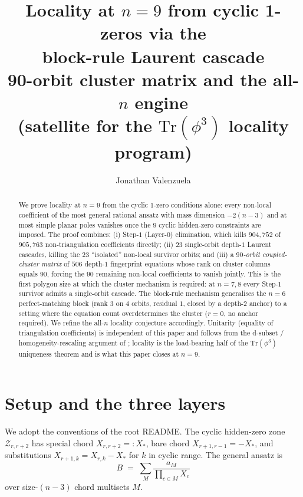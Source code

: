 \documentclass[11pt]{article}
\title{Locality at $n=9$ from cyclic 1-zeros via the\\
       block-rule Laurent cascade\\
       \large 90-orbit cluster matrix and the all-$n$ engine\\
       \small (satellite for the $\mathrm{Tr}(\phi^3)$ locality program)}
\author{Jonathan Valenzuela}
\date{}
\theoremstyle{definition}
\begin{document}
\maketitle

\begin{abstract}
We prove locality at $n=9$ from the cyclic $1$-zero conditions alone:
every non-local coefficient of the most general rational ansatz with
mass dimension $-2(n-3)$ and at most simple planar poles vanishes
once the $9$ cyclic hidden-zero constraints are imposed. The proof
combines: (i) Step-$1$ (Layer-$0$) elimination, which kills
$904{,}752$ of $905{,}763$ non-triangulation coefficients directly;
(ii) $23$ single-orbit depth-$1$ Laurent cascades, killing the
$23$ ``isolated'' non-local survivor orbits; and (iii) a
\emph{$90$-orbit coupled-cluster matrix} of $506$ depth-$1$
fingerprint equations whose rank on cluster columns equals $90$,
forcing the $90$ remaining non-local coefficients to vanish jointly.
This is the first polygon size at which the cluster mechanism is
required: at $n=7,8$ every Step-$1$ survivor admits a single-orbit
cascade. The block-rule mechanism generalises the $n=6$
perfect-matching block (rank $3$ on $4$ orbits, residual $1$,
closed by a depth-$2$ anchor) to a setting where the equation count
overdetermines the cluster ($r=0$, no anchor required). We refine
the all-$n$ locality conjecture accordingly.
Unitarity (equality of triangulation coefficients) is independent of
this paper and follows from the d-subset / homogeneity-rescaling
argument of \cite{notes18,subsetvan}; locality is the load-bearing
half of the $\mathrm{Tr}(\phi^3)$ uniqueness theorem and is what
this paper closes at $n=9$.
\end{abstract}

\section{Setup and the three layers}\label{sec:setup}

We adopt the conventions of the root README. The cyclic
hidden-zero zone $\mathcal Z_{r,r+2}$ has special chord
$X_{r,r+2}=:X_*$, bare chord $X_{r+1,r-1}=-X_*$, and substitutions
$X_{r+1,k}=X_{r,k}-X_*$ for $k$ in cyclic range. The general
ansatz is
\[
   B \;=\; \sum_M \frac{a_M}{\prod_{c\in M}X_c}
\]
over size-$(n-3)$ chord multisets $M$.
\end{document}
